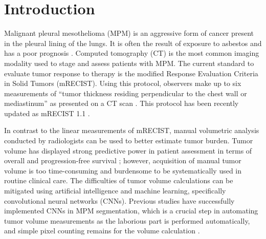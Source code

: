 \documentclass{article}
\begin{document}


\section{Introduction} \label{sec:Intro}
Malignant pleural mesothelioma (MPM) is an aggressive form of cancer present in the pleural lining of the lungs. It is often the result of exposure to asbestos and has a poor prognosis \cite{Gerwen}. Computed tomography (CT) is the most common imaging modality used to stage and assess patients with MPM. The current standard to evaluate tumor response to therapy is the modified Response Evaluation Criteria in Solid Tumors (mRECIST). Using this protocol, observers make up to six measurements of “tumor thickness residing perpendicular to the chest wall or mediastinum” as presented on a CT scan \cite{Byrne}. This protocol has been recently updated as mRECIST 1.1 \cite{Eisenhauer}.

In contrast to the linear measurements of mRECIST, manual volumetric analysis conducted by radiologists can be used to better estimate tumor burden. Tumor volume has displayed strong predictive power in patient assessment in terms of overall and progression-free survival \cite{Pass, Murphy}; however, acquisition of manual tumor volume is too time-consuming and burdensome to be systematically used in routine clinical care. The difficulties of tumor volume calculations can be mitigated using artificial intelligence and machine learning, specifically convolutional neural networks (CNNs). Previous studies have successfully implemented CNNs in MPM segmentation, which is a crucial step in automating tumor volume measurements as the laborious part is performed automatically, and simple pixel counting remains for the volume calculation \cite{EG1, EG2}. 
\end{document}
